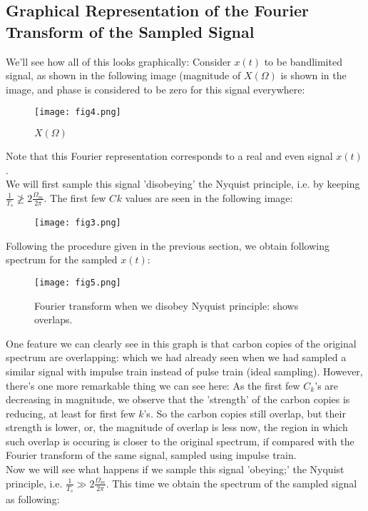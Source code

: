\subsection{Graphical Representation of the Fourier Transform of the Sampled Signal}
We'll see how all of this looks graphically: Consider $x(t)$ to be bandlimited signal, as shown in the following image (magnitude of $X(\Omega)$ is shown in the image, and phase is considered to be zero for this signal everywhere:\\

\begin{figure}[htb]
\centering
\texttt{[image: fig4.png]}
\caption{\label{fig:fig4}$X(\Omega)$}
\end{figure}

Note that this Fourier representation corresponds to a real and even signal $x(t)$.\\
We will first sample this signal 'disobeying' the Nyquist principle, i.e. by keeping $\frac{1}{T_{s}}\ngeq2\frac{\Omega_m}{2\pi}$. The first few $C_{}k$ values are seen in the following image:\\

\begin{figure}[htb]
\centering
\texttt{[image: fig3.png]}
\end{figure}

Following the procedure given in the previous section, we obtain following spectrum for the sampled $x(t)$:\\

\begin{figure}[htb]
\centering
\texttt{[image: fig5.png]}
\caption{\label{fig:fig5}Fourier transform when we disobey Nyquist principle: shows overlaps.}
\end{figure}

One feature we can clearly see in this graph is that carbon copies of the original spectrum are overlapping: which we had already seen when we had sampled a similar signal with impulse train instead of pulse train (ideal sampling). However, there's one more remarkable thing we can see here: As the first few $C_k$'s are decreasing in magnitude, we observe that the 'strength' of the carbon copies is reducing, at least for first few $k$'s. So the carbon copies still overlap, but their strength is lower, or, the magnitude of overlap is less now, the region in which such overlap is occuring is closer to the original spectrum, if compared with the Fourier transform of the same signal, sampled using impulse train.\\
Now we will see what happens if we sample this signal 'obeying;' the Nyquist principle, i.e. $\frac{1}{T_{s}}\gg2\frac{\Omega_m}{2\pi}$. This time we obtain the spectrum of the sampled signal as following:\\

